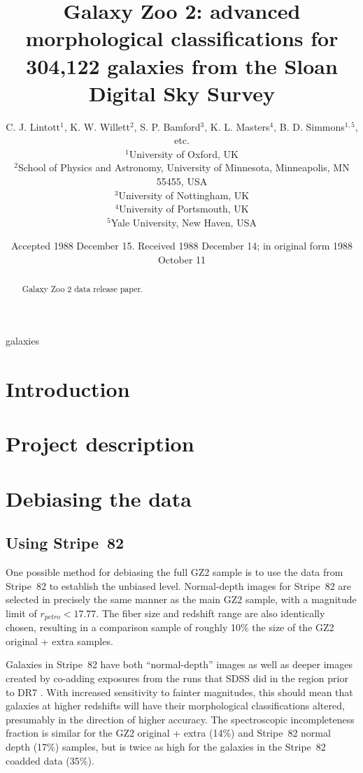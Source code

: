 \documentclass[useAMS,usenatbib]{mn2e}
\title[GZ2 data release]{Galaxy Zoo 2: advanced morphological classifications for 304,122 galaxies from the Sloan Digital Sky Survey}
\author[C.J. Lintott, K.W. Willett, etc.]{C. J. Lintott$^{1}$, K. W. Willett$^{2}$, S. P. Bamford$^{3}$, K. L. Masters$^{4}$, B. D. Simmons$^{1,5}$, etc.\\
$^{1}$University of Oxford, UK \\
$^{2}$School of Physics and Astronomy, University of Minnesota, Minneapolis, MN 55455, USA \\
$^{3}$University of Nottingham, UK \\
$^{4}$University of Portsmouth, UK \\
$^{5}$Yale University, New Haven, USA}
\begin{document}
\date{Accepted 1988 December 15. Received 1988 December 14; in original form 1988 October 11}

\pagerange{\pageref{firstpage}--\pageref{lastpage}} 

\maketitle

\label{firstpage}

\begin{abstract}
Galaxy Zoo 2 data release paper. 
\end{abstract}

\begin{keywords}
galaxies
\end{keywords}

\section{Introduction} \label{sec-intro}
\section{Project description} \label{sec-description}
\section{Debiasing the data} \label{sec-debias}

\subsection{Using Stripe~82}

One possible method for debiasing the full GZ2 sample is to use the data from Stripe~82 to establish the unbiased level. Normal-depth images for Stripe~82 are selected in precisely the same manner as the main GZ2 sample, with a magnitude limit of $r_{petro} < 17.77$. The fiber size and redshift range are also identically chosen, resulting in a comparison sample of roughly 10\% the size of the GZ2 original + extra samples. 


Galaxies in Stripe~82 have both ``normal-depth'' images as well as deeper images created by co-adding exposures from the runs that SDSS did in the region prior to DR7 \citep{ann11}. With increased sensitivity to fainter magnitudes, this should mean that galaxies at higher redshifts will have their morphological classifications altered, presumably in the direction of higher accuracy. The spectroscopic incompleteness fraction is similar for the GZ2 original + extra (14\%) and Stripe~82 normal depth (17\%) samples, but is twice as high for the galaxies in the Stripe~82 coadded data (35\%). 
\end{document}
